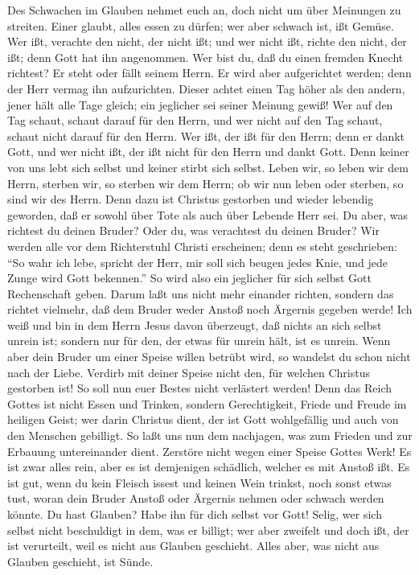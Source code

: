  Des Schwachen im Glauben nehmet euch an, doch nicht um
über Meinungen zu streiten.  Einer glaubt, alles essen zu
dürfen; wer aber schwach ist, ißt Gemüse.  Wer ißt,
verachte den nicht, der nicht ißt; und wer nicht ißt, richte den nicht,
der ißt; denn Gott hat ihn angenommen.  Wer bist du, daß
du einen fremden Knecht richtest? Er steht oder fällt seinem Herrn. Er
wird aber aufgerichtet werden; denn der Herr vermag ihn aufzurichten.
 Dieser achtet einen Tag höher als den andern, jener hält
alle Tage gleich; ein jeglicher sei seiner Meinung gewiß! 
Wer auf den Tag schaut, schaut darauf für den Herrn, und wer nicht auf
den Tag schaut, schaut nicht darauf für den Herrn. Wer ißt, der ißt für
den Herrn; denn er dankt Gott, und wer nicht ißt, der ißt nicht für den
Herrn und dankt Gott.  Denn keiner von uns lebt sich
selbst und keiner stirbt sich selbst.  Leben wir, so leben
wir dem Herrn, sterben wir, so sterben wir dem Herrn; ob wir nun leben
oder sterben, so sind wir des Herrn.  Denn dazu ist
Christus gestorben und wieder lebendig geworden, daß er sowohl über Tote
als auch über Lebende Herr sei.  Du aber, was richtest du
deinen Bruder? Oder du, was verachtest du deinen Bruder? Wir werden alle
vor dem Richterstuhl Christi erscheinen;  denn es steht
geschrieben: ``So wahr ich lebe, spricht der Herr, mir soll sich beugen
jedes Knie, und jede Zunge wird Gott bekennen.''  So wird
also ein jeglicher für sich selbst Gott Rechenschaft geben.
 Darum laßt uns nicht mehr einander richten, sondern das
richtet vielmehr, daß dem Bruder weder Anstoß noch Ärgernis gegeben
werde!  Ich weiß und bin in dem Herrn Jesus davon
überzeugt, daß nichts an sich selbst unrein ist; sondern nur für den,
der etwas für unrein hält, ist es unrein.  Wenn aber dein
Bruder um einer Speise willen betrübt wird, so wandelst du schon nicht
nach der Liebe. Verdirb mit deiner Speise nicht den, für welchen
Christus gestorben ist!  So soll nun euer Bestes nicht
verlästert werden!  Denn das Reich Gottes ist nicht Essen
und Trinken, sondern Gerechtigkeit, Friede und Freude im heiligen Geist;
 wer darin Christus dient, der ist Gott wohlgefällig und
auch von den Menschen gebilligt.  So laßt uns nun dem
nachjagen, was zum Frieden und zur Erbauung untereinander dient.
 Zerstöre nicht wegen einer Speise Gottes Werk! Es ist
zwar alles rein, aber es ist demjenigen schädlich, welcher es mit Anstoß
ißt.  Es ist gut, wenn du kein Fleisch issest und keinen
Wein trinkst, noch sonst etwas tust, woran dein Bruder Anstoß oder
Ärgernis nehmen oder schwach werden könnte.  Du hast
Glauben? Habe ihn für dich selbst vor Gott! Selig, wer sich selbst nicht
beschuldigt in dem, was er billigt;  wer aber zweifelt
und doch ißt, der ist verurteilt, weil es nicht aus Glauben geschieht.
Alles aber, was nicht aus Glauben geschieht, ist Sünde.

